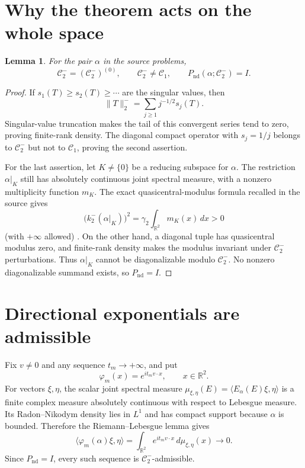 \documentclass[11pt]{article}
\newtheorem{lemma}{Lemma}
\begin{document}
\section*{Why the theorem acts on the whole space}

\begin{lemma}
For the pair $\alpha$ in the source problems,
\[
 \mathcal C_2^-=(\mathcal C_2^-)^{(0)},\qquad
 \mathcal C_2^-\ne\mathcal C_1,\qquad
 P_{\mathrm{nd}}(\alpha;\mathcal C_2^-)=I.
\]
\end{lemma}

\begin{proof}
If $s_1(T)\ge s_2(T)\ge\cdots$ are the singular values, then
\[
 \lVert T\rVert_{2}^{-}=\sum_{j\ge1}j^{-1/2}s_j(T).
\]
Singular-value truncation makes the tail of this convergent series tend to
zero, proving finite-rank density. The diagonal compact operator with
$s_j=1/j$ belongs to $\mathcal C_2^-$ but not to $\mathcal C_1$, proving the
second assertion.

For the last assertion, let $K\ne\{0\}$ be a reducing subspace for $\alpha$.
The restriction $\alpha|_K$ still has absolutely continuous joint spectral
measure, with a nonzero multiplicity function $m_K$. The exact
quasicentral-modulus formula recalled in the source gives
\[
 \bigl(k_2^-(\alpha|_K)\bigr)^2
   =\gamma_2\int_{\mathbb R^2}m_K(x)\,dx>0
\]
(with \(+\infty\) allowed) \cite[Sec.~6]{source}. On the other hand, a
diagonal tuple has quasicentral modulus zero, and finite-rank density makes
the modulus invariant under $\mathcal C_2^-$ perturbations. Thus
$\alpha|_K$ cannot be diagonalizable modulo $\mathcal C_2^-$. No nonzero
diagonalizable summand exists, so $P_{\mathrm{nd}}=I$.
\end{proof}

\section*{Directional exponentials are admissible}

Fix $v\ne0$ and any sequence $t_m\to+\infty$, and put
\[
 \varphi_m(x)=e^{it_m v\cdot x},\qquad x\in\mathbb R^2.
\]
For vectors $\xi,\eta$, the scalar joint spectral measure
$\mu_{\xi,\eta}(E)=\langle E_\alpha(E)\xi,\eta\rangle$ is a finite complex
measure absolutely continuous with respect to Lebesgue measure. Its
Radon--Nikodym density lies in $L^1$ and has compact support because $\alpha$
is bounded. Therefore the Riemann--Lebesgue lemma gives
\[
 \langle\varphi_m(\alpha)\xi,\eta\rangle
 =\int_{\mathbb R^2}e^{it_m v\cdot x}\,d\mu_{\xi,\eta}(x)
 \longrightarrow0.
\]
Since \(P_{\mathrm{nd}}=I\), every such sequence is
$\mathcal C_2^-$-admissible.
\end{document}
